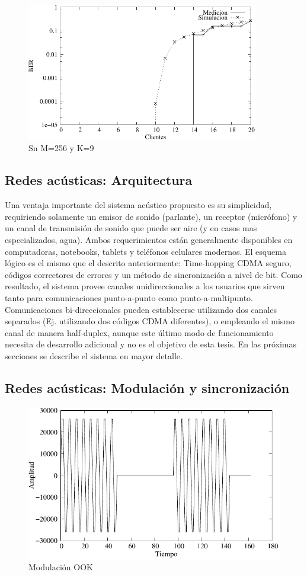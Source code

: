 \begin{figure}[t]
  \centering
    \includegraphics[width=4in]{graphs/audio-fig6}
    \caption{Sn M=256 y K=9}
    \label{arch:AudioSimul}
\end{figure}



\subsection{Redes acústicas: Arquitectura}

Una ventaja importante del sistema acústico propuesto es su simplicidad, requiriendo solamente un emisor de sonido (parlante), un receptor (micrófono) y un canal de transmisión de sonido que puede ser aire (y en casos mas especializados, agua). Ambos requerimientos están generalmente disponibles en computadoras, notebooks, tablets y teléfonos celulares modernos. 
El esquema lógico es el mismo que el descrito anteriormente: Time-hopping CDMA seguro, códigos correctores de errores y un método de sincronización a nivel de bit.
Como resultado, el sistema provee canales unidireccionales a los usuarios que sirven tanto para comunicaciones punto-a-punto como punto-a-multipunto. Comunicaciones bi-direccionales pueden establecerse utilizando dos canales separados (Ej. utilizando dos códigos CDMA diferentes), o empleando el mismo canal de manera half-duplex, aunque este último modo de funcionamiento necesita de desarrollo adicional y no es el objetivo de esta tesis.
En las próximas secciones se describe el sistema en mayor detalle.

\subsection{Redes acústicas: Modulación y sincronización}
\begin{figure}[t]
  \centering
    \includegraphics[width=4.5in]{graphs/modulated.pdf}
    \caption{Modulación OOK}
    \label{arch:sync}
\end{figure}


